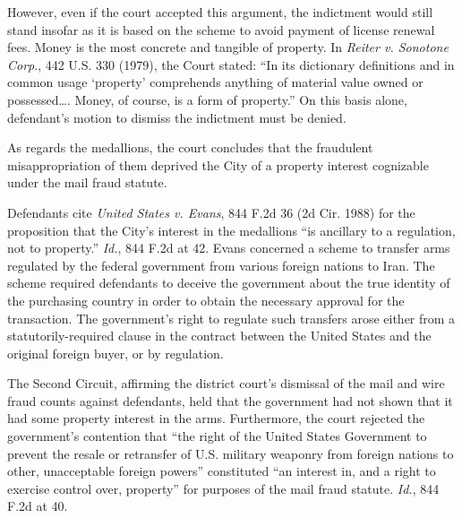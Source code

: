 However, even if the court accepted this argument, the indictment would still
stand insofar as it is based on the scheme to avoid payment of license renewal
fees. Money is the most concrete and tangible of property. In \textit{Reiter v.
Sonotone Corp}., 442 U.S. 330 (1979), the Court stated: ``In its dictionary
definitions and in common usage `property' comprehends anything of material
value owned or possessed\dots . Money, of course, is a form of property.'' On
this basis alone, defendant's motion to dismiss the indictment must be denied.

As regards the medallions, the court concludes that the fraudulent
misappropriation of them deprived the City of a property interest cognizable
under the mail fraud statute.

Defendants cite \textit{United States v. Evans}, 844 F.2d 36 (2d Cir. 1988) for
the proposition that the City's interest in the medallions ``is ancillary to a
regulation, not to property.'' \textit{Id.}, 844 F.2d at 42. Evans concerned a
scheme to transfer arms regulated by the federal government from various
foreign nations to Iran. The scheme required defendants to deceive the
government about the true identity of the purchasing country in order to obtain
the necessary approval for the transaction. The government's right to regulate
such transfers arose either from a statutorily-required clause in the contract
between the United States and the original foreign buyer, or by regulation.

The Second Circuit, affirming the district court's dismissal of the mail and
wire fraud counts against defendants, held that the government had not shown
that it had some property interest in the arms. Furthermore, the court rejected
the government's contention that ``the right of the United States Government to
prevent the resale or retransfer of U.S. military weaponry from foreign nations
to other, unacceptable foreign powers'' constituted ``an interest in, and a
right to exercise control over, property'' for purposes of the mail fraud
statute. \textit{Id.}, 844 F.2d at 40.

